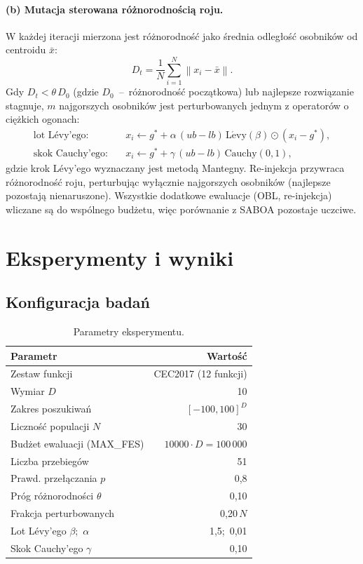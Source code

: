 \documentclass[12pt]{article}
\begin{document}
\paragraph{(b) Mutacja sterowana różnorodnością roju.}
W każdej iteracji mierzona jest różnorodność jako średnia odległość osobników od
centroidu $\bar{x}$:
\begin{equation}
D_t = \frac{1}{N}\sum_{i=1}^{N}\left\lVert x_i - \bar{x}\right\rVert.
\end{equation}
Gdy $D_t < \theta\,D_0$ (gdzie $D_0$~--~różnorodność początkowa) lub najlepsze
rozwiązanie stagnuje, $m$ najgorszych osobników jest perturbowanych jednym z operatorów
o ciężkich ogonach:
\begin{align}
\text{lot Lévy'ego:}\quad & x_i \leftarrow g^{*} + \alpha\,(ub-lb)\,\mathrm{L\acute{e}vy}(\beta)\odot(x_i - g^{*}),\\
\text{skok Cauchy'ego:}\quad & x_i \leftarrow g^{*} + \gamma\,(ub-lb)\,\mathrm{Cauchy}(0,1),
\end{align}
gdzie krok Lévy'ego wyznaczany jest metodą Mantegny. Re-injekcja przywraca różnorodność
roju, perturbując wyłącznie najgorszych osobników (najlepsze pozostają nienaruszone).
Wszystkie dodatkowe ewaluacje (OBL, re-injekcja) wliczane są do wspólnego budżetu, więc
porównanie z SABOA pozostaje uczciwe.

\section{Eksperymenty i wyniki}

\subsection{Konfiguracja badań}
\begin{table}[H]
\centering
\caption{Parametry eksperymentu.}
\label{tab:konfiguracja}
\begin{tabular}{lr}
\toprule
\textbf{Parametr} & \textbf{Wartość} \\
\midrule
Zestaw funkcji & CEC2017 (12 funkcji) \\
Wymiar $D$ & 10 \\
Zakres poszukiwań & $[-100, 100]^{D}$ \\
Liczność populacji $N$ & 30 \\
Budżet ewaluacji (MAX\_FES) & $10000\cdot D = 100\,000$ \\
Liczba przebiegów & 51 \\
Prawd. przełączania $p$ & 0{,}8 \\
Próg różnorodności $\theta$ & 0{,}10 \\
Frakcja perturbowanych & 0{,}20\,$N$ \\
Lot Lévy'ego $\beta$;\ $\alpha$ & 1{,}5;\ 0{,}01 \\
Skok Cauchy'ego $\gamma$ & 0{,}10 \\
\bottomrule
\end{tabular}
\end{table}
\end{document}
